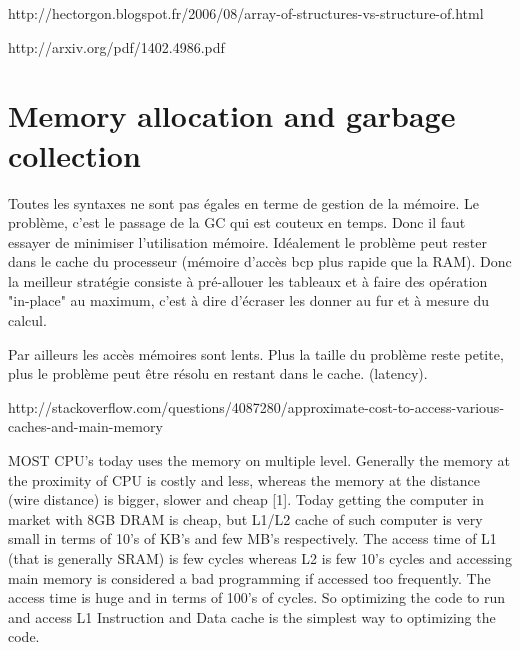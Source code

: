 http://hectorgon.blogspot.fr/2006/08/array-of-structures-vs-structure-of.html

http://arxiv.org/pdf/1402.4986.pdf

\newpage
\section{Memory allocation and garbage collection}

Toutes les syntaxes ne sont pas égales en terme de gestion de la mémoire.
Le problème, c'est le passage de la GC qui est couteux en temps. Donc il faut essayer de minimiser l'utilisation mémoire. Idéalement le problème peut rester dans le cache du processeur (mémoire d'accès bcp plus rapide que la RAM). Donc la meilleur stratégie consiste à pré-allouer les tableaux et à faire des opération "in-place" au maximum, c'est à dire d'écraser les donner au fur et à mesure du calcul.

Par ailleurs les accès mémoires sont lents.
Plus la taille du problème reste petite, plus le problème peut être résolu en restant dans le cache. (latency).

http://stackoverflow.com/questions/4087280/approximate-cost-to-access-various-caches-and-main-memory

MOST CPU’s today uses the memory on multiple level.  Generally  the  memory  at  the  proximity  of  CPU  is costly and less, whereas the memory at the distance (wire distance)  is  bigger,  slower  and  cheap [1].  Today  getting  the  computer  in  market  with  8GB  DRAM  is  cheap,  but  L1/L2  cache  of  such  computer  is  very  small  in  terms  of 10’s  of  KB’s  and  few  MB’s  respectively.  The  access time  of  L1  (that  is  generally  SRAM) is  few  cycles whereas  L2  is  few  10’s  cycles  and  accessing  main memory  is  considered  a  bad  programming  if  accessed too  frequently.  The  access  time  is  huge  and  in  terms  of 100’s of cycles. So optimizing the code to run and access L1  Instruction  and  Data  cache  is  the  simplest  way  to optimizing the code.


